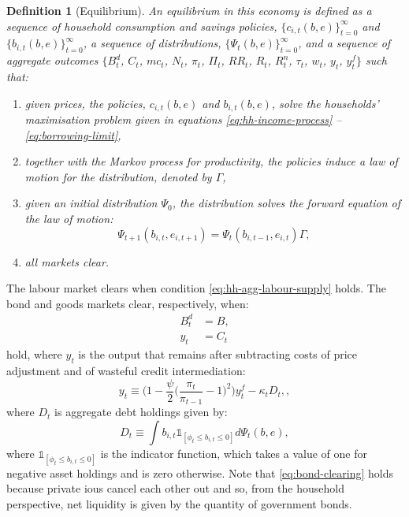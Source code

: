 \documentclass[12pt]{article} %
\numberwithin{equation}{section} %
\newtheorem{definition}{Definition}
\begin{document}
\begin{definition}[Equilibrium]
\label{def:eq}
An equilibrium in this economy is defined as a sequence of household consumption and savings policies, $\{ c_{i,t} (b, e) \}_{t=0}^{\infty}$ and $\{ b_{i,t} (b, e) \}_{t=0}^{\infty}$, a sequence of distributions, $\{ \Psi_t (b,e) \}_{t=0}^{\infty} $, and a sequence of aggregate outcomes $\{ B_t^d$, $C_t$, $mc_t$, $N_t$, $\pi_t$, $\Pi_t$, $RR_t$, $R_t$, $R_t^n$, $\tau_t$, $w_t$, $y_t$, $y_t^f \}$ such that:
\begin{enumerate}
    \item given prices, the policies, $c_{i,t} (b, e)$ and $b_{i,t} (b, e)$, solve the households' maximisation problem given in equations \eqref{eq:hh-income-process} -- \eqref{eq:borrowing-limit},
    \item together with the Markov process for productivity, the policies induce a law of motion for the distribution, denoted by $\Gamma$,
    \item given an initial distribution $\Psi_0$, the distribution solves the forward equation of the law of motion:
    \begin{equation*}
        \Psi_{t+1} (b_{i,t},e_{i,t+1}) = \Psi_{t} (b_{i,t-1},e_{i,t}) \Gamma,
    \end{equation*}
    \item all markets clear.
\end{enumerate}
\end{definition}

The labour market clears when condition \eqref{eq:hh-agg-labour-supply} holds. The bond and goods markets clear, respectively, when:
\begin{align}
    B_t^d &= B, \label{eq:bond-clearing} \\
    y_t &= C_t \label{eq:goods-clearing}
\end{align}
hold, where $y_t$ is the output that remains after subtracting costs of price adjustment and of wasteful credit intermediation:
\begin{equation}
    y_t \equiv \Bigg( 1 - \frac{\psi}{2} \Bigg( \frac{\pi_t}{\pi_{t-1}} - 1 \Bigg)^2 \Bigg) y_t^f - \kappa_t D_t, \label{eq:effective-gdp},
\end{equation}
where $D_t$ is aggregate debt holdings given by:
\begin{equation}
    D_t \equiv \int b_{i,t} \mathbb{1}_{[\phi_t \le b_{i,t} \le 0]} d \Psi_t (b,e), \label{eq:agg-debt}
\end{equation}
where $\mathbb{1}_{[\phi_t \le b_{i,t} \le 0]}$ is the indicator function, which takes a value of one for negative asset holdings and is zero otherwise. Note that \eqref{eq:bond-clearing} holds because private \Gls{iou}s cancel each other out and so, from the household perspective, net liquidity is given by the quantity of government bonds. 
\end{document}
